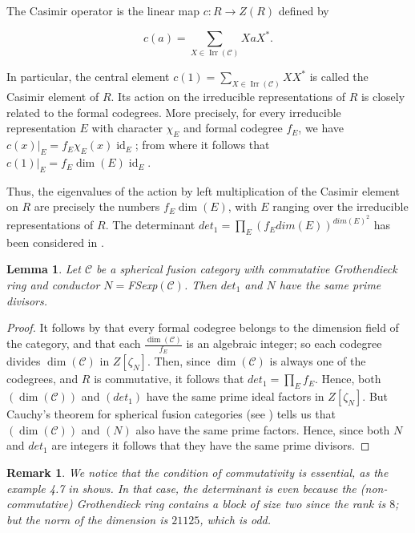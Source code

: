 \documentclass[a4paper,twoside,11pt]{amsart}
\newtheorem*{remark}{Remark}
\newtheorem{lemma}[theorem]{Lemma}
\theoremstyle{plain} %
\theoremstyle{definition}
\begin{document}
The Casimir operator is the linear map $c:R\to Z(R)$ defined by

$$
c(a)=\sum_{X\in\operatorname{Irr}(\mathcal{C})}XaX^*.
$$

In particular, the central element $c(1)=\sum_{X\in\operatorname{Irr}(\mathcal{C})}XX^*$ is called the Casimir element of $R$. Its action on the irreducible representations of $R$ is closely related to the formal codegrees. More precisely, for every irreducible representation $E$ with character $\chi_E$ and formal codegree $f_E$, we have $
c(x)|_E=f_E\chi_E(x)\operatorname{id}_E$; from where it follows that $c(1)|_E=f_E\dim(E)\operatorname{id}_E$.
\medskip

Thus, the eigenvalues of the action by left multiplication of the Casimir element on $R$ are precisely the numbers $f_E\dim(E)$, with $E$ ranging over the irreducible representations of $R$. The determinant $det_1=\prod_{E} (f_E dim(E))^{dim(E)^2}$ has been considered in \cite{WLL}.

\begin{lemma}
   Let $\mathcal{C}$ be a spherical fusion category with commutative Grothendieck ring and conductor $N=$FSexp$(\mathcal{C})$. Then $det_1$ and $N$ have the same prime divisors.
 \end{lemma}
\begin{proof}
    It follows by \cite{O2} that every formal codegree belongs to the dimension field of the category, and that each $\frac{\dim(\mathcal{C})}{f_E}$ is an algebraic integer; so each codegree divides $\dim(\mathcal{C})$ in $Z[\zeta_N]$. Then, since $\dim(\mathcal{C})$ is always one of the codegrees, and $R$ is commutative, it follows that $det_1=\prod_{E} f_E$. Hence, both $(\dim(\mathcal{C}))$ and $(det_1)$ have the same prime ideal factors in $Z[\zeta_N]$. But Cauchy's theorem for spherical fusion categories (see \cite{BNRW}) tells us that $(\dim(\mathcal{C}))$ and $(N)$ also have the same prime factors. Hence, since both $N$ and $det_1$ are integers it follows that they have the same prime divisors.
\end{proof}
\begin{remark}
    We notice that the condition of commutativity is essential, as the example 4.7 in \cite{Scn} shows. In that case, the determinant is even because the (non-commutative) Grothendieck ring contains a block of size two since the rank is $8$; but the norm of the dimension is $21125$, which is odd.
\end{remark}
\medskip
\end{document}
